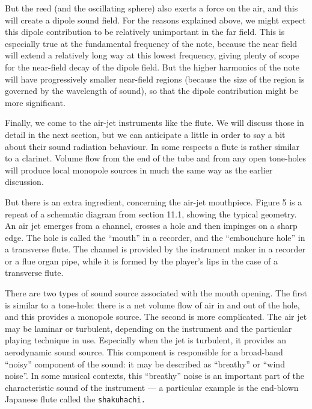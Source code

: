   But the reed (and the oscillating sphere) also exerts a force on the air, and 
  this will create a dipole sound field. For the reasons explained above, we 
  might expect this dipole contribution to be relatively unimportant in the far 
  field. This is especially true at the fundamental frequency of the note, 
  because the near field will extend a relatively long way at this lowest 
  frequency, giving plenty of scope for the near-field decay of the dipole 
  field. But the higher harmonics of the note will have progressively smaller 
  near-field regions (because the size of the region is governed by the 
  wavelength of sound), so that the dipole contribution might be more 
  significant. 

  Finally, we come to the air-jet instruments like the flute. We will discuss 
  those in detail in the next section, but we can anticipate a little in order 
  to say a bit about their sound radiation behaviour. In some respects a flute 
  is rather similar to a clarinet. Volume flow from the end of the tube and 
  from any open tone-holes will produce local monopole sources in much the same 
  way as the earlier discussion. 

  But there is an extra ingredient, concerning the air-jet mouthpiece. Figure 5 
  is a repeat of a schematic diagram from section 11.1, showing the typical 
  geometry. An air jet emerges from a channel, crosses a hole and then impinges 
  on a sharp edge. The hole is called the “mouth” in a recorder, and the 
  “embouchure hole” in a transverse flute. The channel is provided by the 
  instrument maker in a recorder or a flue organ pipe, while it is formed by 
  the player’s lips in the case of a transverse flute. 

  There are two types of sound source associated with the mouth opening. The 
  first is similar to a tone-hole: there is a net volume flow of air in and out 
  of the hole, and this provides a monopole source. The second is more 
  complicated. The air jet may be laminar or turbulent, depending on the 
  instrument and the particular playing technique in use. Especially when the 
  jet is turbulent, it provides an aerodynamic sound source. This component is 
  responsible for a broad-band “noisy” component of the sound: it may be 
  described as “breathy” or “wind noise”. In some musical contexts, this 
  “breathy” noise is an important part of the characteristic sound of the 
  instrument — a particular example is the end-blown Japanese flute called the 
  \tt{}shakuhachi\rm{}. 

